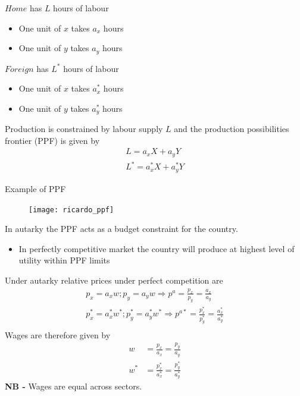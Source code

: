 \documentclass{beamer}
\begin{document}
\begin{frame}
  $Home$ has $L$ hours of labour\\
  \begin{itemize}
    \item One unit of $x$ takes $a_x$ hours
    \item One unit of $y$ takes $a_y$ hours
  \end{itemize}
  \medskip
  $Foreign$ has $L^*$ hours of labour
  \begin{itemize}
    \item One unit of $x$ takes $a_x^*$ hours
    \item One unit of $y$ takes $a_y^*$ hours
  \end{itemize}
\end{frame}

\begin{frame}
  Production is constrained by labour supply $L$ and the production possibilities frontier (PPF) is given by
  \begin{align*}
    L=a_xX+a_yY\\
    L^*=a_x^*X+a_y^*Y
  \end{align*}
\end{frame}

\begin{frame}{Example of PPF}
  \begin{figure}
    \texttt{[image: ricardo\_ppf]}
  \end{figure}
\end{frame}

\begin{frame}
  In autarky the PPF acts as a budget constraint for the country.
  \begin{itemize}
    \item In perfectly competitive market the country will produce at highest level of utility within PPF limits
  \end{itemize}  
\end{frame}

\begin{frame}
  Under autarky relative prices under perfect competition are
  \begin{align*}
    p_x=a_x w; p_y=a_yw \Rightarrow p^a =\frac{p_x}{p_y}=\frac{a_x}{a_y}\\
    p_x^*=a_x^* w^*; p_y^*=a_y^*w^* \Rightarrow p^{a*} =\frac{p_x^*}{p_y^*}=\frac{a_x^*}{a_y^*}\\    
  \end{align*}
  Wages are therefore given by
  \begin{align*}
    w &= \frac{p_x}{a_x}=\frac{p_y}{a_y}\\
    w^* &= \frac{p_x^*}{a_x^*}=\frac{p_y^*}{a_y^*}
  \end{align*}
  \textbf{NB -} Wages are equal across sectors.
\end{frame}
\end{document}
